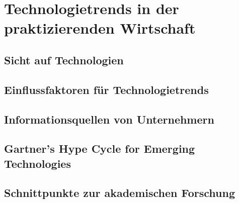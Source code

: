 \section{Technologietrends in der praktizierenden Wirtschaft}
\subsection{Sicht auf Technologien}
\subsection{Einflussfaktoren für Technologietrends}
\subsection{Informationsquellen von Unternehmern}
\subsection{Gartner’s Hype Cycle for Emerging Technologies}
\subsection{Schnittpunkte zur akademischen Forschung}